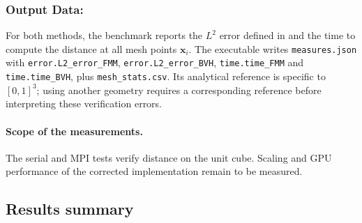 \subsubsection{Output Data:}

For both methods, the benchmark reports the $L^2$ error defined in
 and the time to compute the distance
at all mesh points $\mathbf{x}_i$.
The executable writes \texttt{measures.json} with
\nolinkurl{error.L2_error_FMM}, \nolinkurl{error.L2_error_BVH},
\nolinkurl{time.time_FMM} and \nolinkurl{time.time_BVH}, plus
\texttt{mesh\_stats.csv}. Its analytical reference is specific to $[0,1]^3$;
using another geometry requires a corresponding reference before interpreting
these verification errors.




\paragraph{Scope of the measurements.}
The serial and MPI tests verify distance on the unit cube. Scaling and GPU
performance of the corrected implementation remain to be measured.

\subsection{Results summary}


